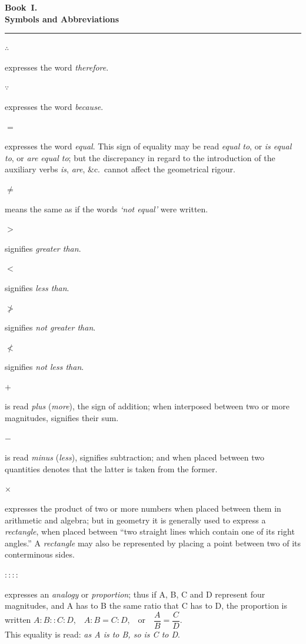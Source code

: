 \documentclass[12pt]{article}
\newcommand{\symrow}[2]{%
  \vspace{0.25cm}%
  \noindent%
  \begin{minipage}[t]{0.22\linewidth}%
    \vspace{0pt}\centering\Large #1%
  \end{minipage}\hfill%
  \begin{minipage}[t]{0.74\linewidth}%
    \vspace{4pt}#2%
  \end{minipage}%
}
\begin{document}
\begin{center}
  {\large\textbf{Book~I.}}\\[4pt]
  {\Large\textbf{Symbols and Abbreviations}}
\end{center}

\vspace{0.4cm}
\noindent\rule{\linewidth}{0.4pt}
\vspace{0.2cm}

\symrow{$\therefore$}{expresses the word \emph{therefore}.}

\symrow{$\because$}{expresses the word \emph{because}.}

\symrow{$=$}{expresses the word \emph{equal}. This sign of equality may be
  read \emph{equal to}, or \emph{is equal to}, or \emph{are equal to}; but
  the discrepancy in regard to the introduction of the auxiliary verbs
  \emph{is}, \emph{are}, \&c.\ cannot affect the geometrical rigour.}

\symrow{$\neq$}{means the same as if the words \emph{`not equal'} were written.}

\symrow{$>$}{signifies \emph{greater than}.}

\symrow{$<$}{signifies \emph{less than}.}

\symrow{$\ngtr$}{signifies \emph{not greater than}.}

\symrow{$\nless$}{signifies \emph{not less than}.}

\symrow{$+$}{is read \emph{plus} (\emph{more}), the sign of addition; when
  interposed between two or more magnitudes, signifies their sum.}

\symrow{$-$}{is read \emph{minus} (\emph{less}), signifies subtraction; and
  when placed between two quantities denotes that the latter is taken from
  the former.}

\symrow{$\times$}{expresses the product of two or more numbers when placed
  between them in arithmetic and algebra; but in geometry it is generally
  used to express a \emph{rectangle}, when placed between ``two straight
  lines which contain one of its right angles.'' A \emph{rectangle} may also
  be represented by placing a point between two of its conterminous sides.}

\symrow{$: :: :$}{expresses an \emph{analogy} or \emph{proportion}; thus if
  A, B, C and D represent four magnitudes, and A has to B the same ratio
  that C has to D, the proportion is written
  $A : B :: C : D$,\ \ $A : B = C : D$,\ \ or\ \ $\dfrac{A}{B} = \dfrac{C}{D}$.\\[4pt]
  This equality is read: \emph{as A is to B, so is C to D}.}
\end{document}
